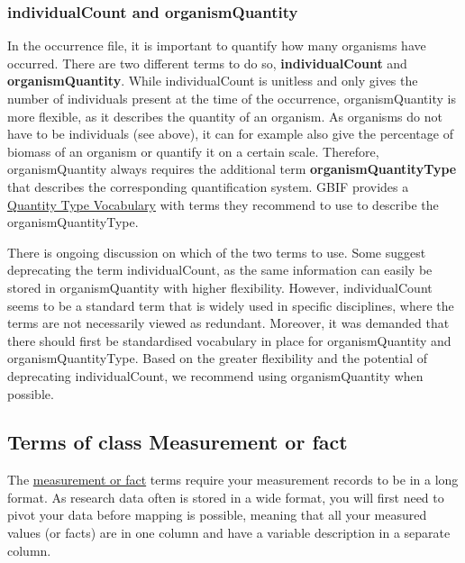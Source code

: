 \documentclass[
]{book}
\begin{document}
\hypertarget{individualcount-and-organismquantity}{%
\subsubsection{individualCount and organismQuantity}\label{individualcount-and-organismquantity}}

In the occurrence file, it is important to quantify how many organisms have occurred. There are two different terms to do so, \textbf{individualCount} and \textbf{organismQuantity}. While individualCount is unitless and only gives the number of individuals present at the time of the occurrence, organismQuantity is more flexible, as it describes the quantity of an organism. As organisms do not have to be individuals (see above), it can for example also give the percentage of biomass of an organism or quantify it on a certain scale. Therefore, organismQuantity always requires the additional term \textbf{organismQuantityType} that describes the corresponding quantification system. GBIF provides a \href{https://rs.gbif.org/vocabulary/gbif/quantity_type_2015-07-10.xml}{Quantity Type Vocabulary} with terms they recommend to use to describe the organismQuantityType.

There is ongoing discussion on which of the two terms to use. Some suggest deprecating the term individualCount, as the same information can easily be stored in organismQuantity with higher flexibility. However, individualCount seems to be a standard term that is widely used in specific disciplines, where the terms are not necessarily viewed as redundant. Moreover, it was demanded that there should first be standardised vocabulary in place for organismQuantity and organismQuantityType. Based on the greater flexibility and the potential of deprecating individualCount, we recommend using organismQuantity when possible.

\hypertarget{mof}{%
\subsection{Terms of class Measurement or fact}\label{mof}}

The \protect\hyperlink{measurementorfact}{measurement or fact} terms require your measurement records to be in a long format. As research data often is stored in a wide format, you will first need to pivot your data before mapping is possible, meaning that all your measured values (or facts) are in one column and have a variable description in a separate column.
\end{document}
